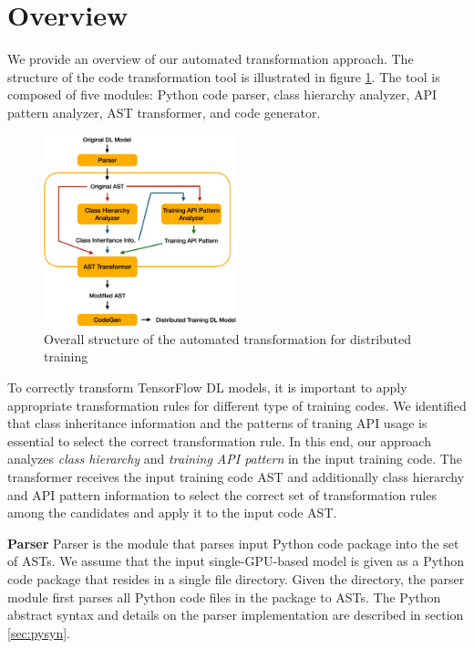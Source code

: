 \section{Overview}

We provide an overview of our automated transformation approach.
The structure of the code transformation tool is 
illustrated in figure \ref{sysarch}.
The tool is composed of five modules: Python code parser,
class hierarchy analyzer, API pattern analyzer, AST transformer,
and code generator.

\begin{figure}[ht!]
  \centering
  \includegraphics[width=0.5\textwidth]{tool-arch.pdf}
  \caption{Overall structure of the 
  automated transformation for distributed training}
  \label{sysarch}
\end{figure}
  
To correctly transform TensorFlow DL models,
it is important to apply appropriate transformation rules
for different type of training codes.
We identified that class inheritance information and
the patterns of traning API usage is essential to 
select the correct transformation rule. 
In this end, our approach analyzes \textit{class hierarchy}
and \textit{training API pattern} in the input training code.
The transformer receives the input training code AST and
additionally class hierarchy and API pattern information
to select the correct set of transformation rules among the candidates
and apply it to the input code AST.

\textbf{Parser}
Parser is the module that parses input Python code package
into the set of ASTs.
We assume that the input single-GPU-based model is given as a Python code
package that resides in a single file directory.
Given the directory, the parser module first parses all Python code files
in the package to ASTs.
The Python abstract syntax and details on the parser implementation
are described in section \ref{sec:pysyn}.


